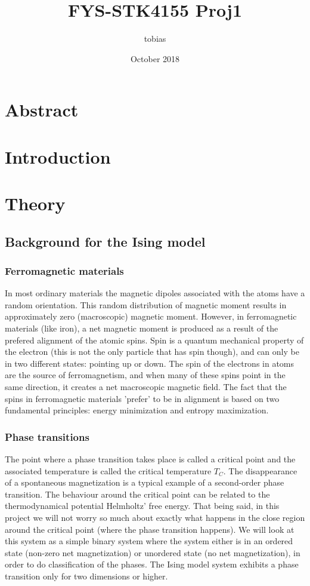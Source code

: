\documentclass[a4paper,12pt]{article}
\title{FYS-STK4155 Proj1}
\author{tobias }
\date{October 2018}
\begin{document}
\maketitle

\section{Abstract}

\section{Introduction}

\section{Theory}

\subsection{Background for the Ising model}

\subsubsection{Ferromagnetic materials}
In most ordinary materials the magnetic dipoles associated with the atoms have a random orientation. This random distribution of magnetic moment results in approximately zero (macroscopic) magnetic moment. However, in ferromagnetic materials (like iron), a net magnetic moment is produced as a result of the prefered alignment of the atomic spins.
Spin is a quantum mechanical property of the electron (this is not the only particle that has spin though), and can only be in two different states: pointing up or down. The spin of the electrons in atoms are the source of ferromagnetism, and when many of these spins point in the same direction, it creates a net macroscopic magnetic field.
The fact that the spins in ferromagnetic materials 'prefer' to be in alignment is based on two fundamental principles: energy minimization and entropy maximization.

\subsubsection{Phase transitions}
The point where a phase transition takes place is called a critical point and the associated temperature is called the critical temperature $T_C$. The disappearance of a spontaneous magnetization is a typical example of a second-order phase transition. The behaviour around the critical point can be related to the thermodynamical potential Helmholtz' free energy. That being said, in this project we will not worry so much about exactly what happens in the close region around the critical point (where the phase transition happens). We will look at this system as a simple binary system where the system either is in an ordered state (non-zero net magnetization) or unordered state (no net magnetization), in order to do classification of the phases.\newline
The Ising model system exhibits a phase transition only for two dimensions or higher.
\end{document}
